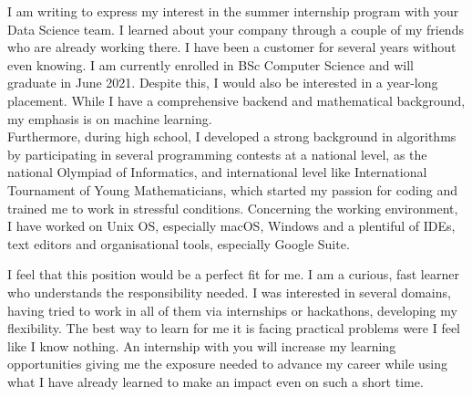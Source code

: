\documentclass[12pt, a4paper]{awesome-cv}
\begin{document}
\makecvheader

\makelettertitle

\begin{cvletter}
I am writing to express my interest in the summer internship program with your Data Science team. I learned about your company through a couple of my friends who are already working there. I have been a customer for several years without even knowing.
I am currently enrolled in BSc Computer Science and will graduate in June 2021. Despite this, I would also be interested in a year-long placement. While I have a comprehensive backend and mathematical background, my emphasis is on machine learning. \\
Furthermore, during high school, I developed a strong background in algorithms by participating in several programming contests at a national level, as the national Olympiad of Informatics, and international level like International Tournament of Young Mathematicians, which started my passion for coding and trained me to work in stressful conditions. Concerning the working environment, I have worked on Unix OS, especially macOS, Windows and a plentiful of IDEs, text editors and organisational tools, especially Google Suite.


I feel that this position would be a perfect fit for me. I am a curious, fast learner who understands the responsibility needed. I was interested in several domains, having tried to work in all of them via internships or hackathons, developing my flexibility. The best way to learn for me it is facing practical problems were I feel like I know nothing. An internship with you will increase my learning opportunities giving me the exposure needed to advance my career while using what I have already learned to make an impact even on such a short time.



\end{cvletter}
\end{document}
